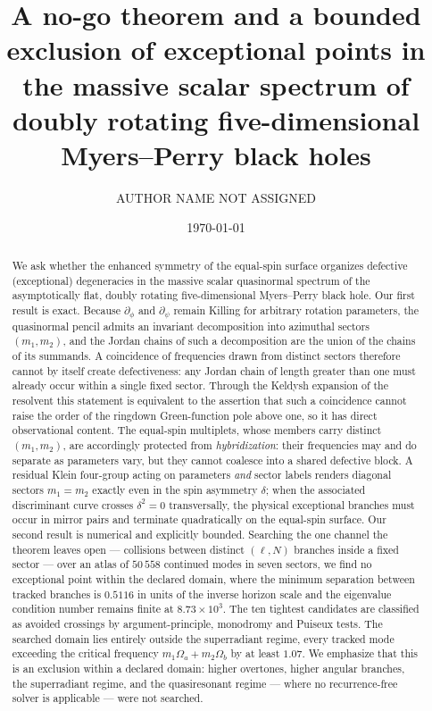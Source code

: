 \documentclass[aps,prd,reprint,superscriptaddress,nofootinbib,longbibliography]{revtex4-2}
\theoremstyle{plain}
\theoremstyle{definition}
\theoremstyle{remark}
\begin{document}
\title{A no-go theorem and a bounded exclusion of exceptional points in the
massive scalar spectrum of doubly rotating five-dimensional Myers--Perry black
holes}

\author{AUTHOR NAME NOT ASSIGNED}

\date{\today}

\begin{abstract}
We ask whether the enhanced symmetry of the equal-spin surface organizes
defective (exceptional) degeneracies in the massive scalar quasinormal spectrum
of the asymptotically flat, doubly rotating five-dimensional Myers--Perry black
hole. Our first result is exact. Because $\partial_\phi$ and $\partial_\psi$
remain Killing for arbitrary rotation parameters, the quasinormal pencil admits
an invariant decomposition into azimuthal sectors $(m_1,m_2)$, and the Jordan
chains of such a decomposition are the union of the chains of its summands. A
coincidence of frequencies drawn from distinct sectors therefore cannot by
itself create defectiveness: any Jordan chain of length greater than one must
already occur within a single fixed sector. Through the Keldysh expansion of the
resolvent this statement is equivalent to the assertion that such a coincidence
cannot raise the order of the ringdown Green-function pole above one, so it has
direct observational content. The equal-spin multiplets, whose members carry
distinct $(m_1,m_2)$, are accordingly protected from \emph{hybridization}: their
frequencies may and do separate as parameters vary, but they cannot coalesce
into a shared defective block. A residual Klein four-group acting on parameters
\emph{and} sector labels renders diagonal sectors $m_1=m_2$ exactly even in the
spin asymmetry $\delta$; when the associated discriminant curve crosses
$\delta^2=0$ transversally, the physical exceptional branches must occur in
mirror pairs and terminate quadratically on the equal-spin surface. Our second
result is numerical and explicitly bounded. Searching the one channel the
theorem leaves open --- collisions between distinct $(\ell,N)$ branches inside a
fixed sector --- over an atlas of $50\,558$ continued modes in seven sectors, we
find no exceptional point within the declared domain, where the minimum
separation between tracked branches is $0.5116$ in units of the inverse horizon
scale and the eigenvalue condition number remains finite at
$8.73\times10^{3}$. The ten tightest candidates are classified as avoided
crossings by argument-principle, monodromy and Puiseux tests. The searched
domain lies entirely outside the superradiant regime, every tracked mode
exceeding the critical frequency $m_1\Omega_a+m_2\Omega_b$ by at least $1.07$.
We emphasize that this is an exclusion within a declared domain: higher
overtones, higher angular branches, the superradiant regime, and the
quasiresonant regime --- where no recurrence-free solver is applicable --- were
not searched.
\end{abstract}
\end{document}
